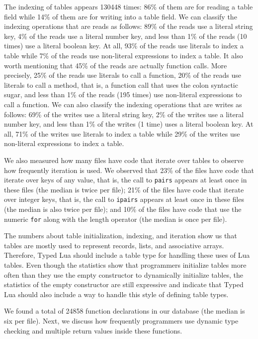 The indexing of tables appears 130448 times:
86\% of them are for reading a table field while
14\% of them are for writing into a table field.
We can classify the indexing operations that are reads as follows:
89\% of the reads use a literal string key,
4\% of the reads use a literal number key,
and less than 1\% of the reads (10 times) use a literal boolean key.
At all, 93\% of the reads use literals to index a table while
7\% of the reads use non-literal expressions to index a table.
It also worth mentioning that 45\% of the reads are actually
function calls.
More precisely, 25\% of the reads use literals to call a function,
20\% of the reads use literals to call a method, that is,
a function call that uses the colon syntactic sugar, 
and less than 1\% of the reads (195 times) use non-literal expressions
to call a function.
We can also classify the indexing operations that are writes as follows: 
69\% of the writes use a literal string key,
2\% of the writes use a literal number key,
and less than 1\% of the writes (1 time) uses a literal boolean key.
At all, 71\% of the writes use literals to index a table while
29\% of the writes use non-literal expressions to index a table.

We also measured how many files have code that iterate over tables to
observe how frequently iteration is used.
We observed that 23\% of the files have code that iterate over keys
of any value, that is, the call to \texttt{pairs} appears at least
once in these files (the median is twice per file);
21\% of the files have code that iterate over integer keys, that is,
the call to \texttt{ipairs} appears at least once in these files
(the median is also twice per file);
and 10\% of the files have code that use the numeric \texttt{for}
along with the length operator (the median is once per file).

The numbers about table initialization, indexing, and iteration
show us that tables are mostly used to represent records, lists,
and associative arrays.
Therefore, Typed Lua should include a table type for handling
these uses of Lua tables.
Even though the statistics show that programmers initialize tables
more often than they use the empty constructor to
dynamically initialize tables, the statistics of the empty
constructor are still expressive and indicate that Typed Lua should
also include a way to handle this style of defining table types.

We found a total of 24858 function declarations in our database
(the median is six per file).
Next, we discuss how frequently programmers use dynamic type
checking and multiple return values inside these functions.

